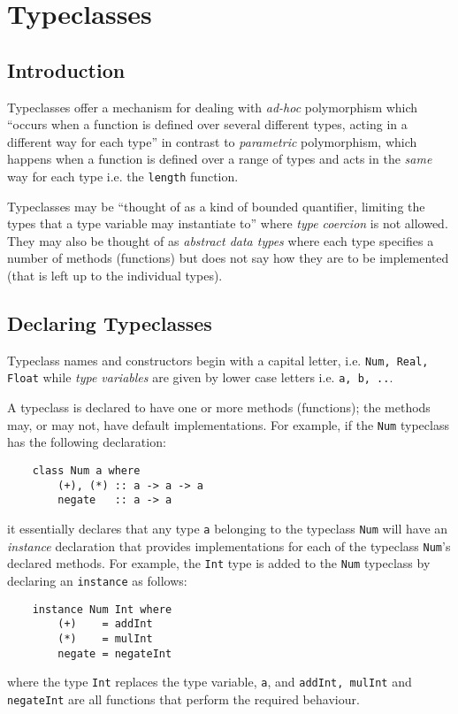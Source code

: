 \chapter{Typeclasses}
\section{Introduction}
Typeclasses offer a mechanism for dealing with {\em ad-hoc} polymorphism which ``occurs when a function is defined over several different types, acting in a different way for each type''  in contrast to  {\em parametric} polymorphism, which happens when a function is defined over a range of types and acts in  the {\em same} way  for each type i.e. the \texttt{length} function.  \citep {WADLER-BLOTT}

Typeclasses may be ``thought of as a kind of bounded quantifier, limiting the types that a type variable may instantiate to'' where {\em type coercion} is not allowed. They may also be thought of as {\em abstract data types} where each type specifies a number of methods (functions) but does not say how they are to be implemented (that is left up to the individual types).  \citep {WADLER-BLOTT}

\section{Declaring Typeclasses}
Typeclass names and constructors begin with a capital letter, i.e.  \texttt{Num, Real, Float} while {\em type variables} are given by lower case letters i.e. \texttt{a, b, ..}.

A typeclass is declared to have one or more methods (functions); the methods may, or may not, have default implementations. For example, if the \texttt{Num} typeclass has the following declaration:
\begin{lstlisting}
	class Num a where
		(+), (*) :: a -> a -> a
		negate   :: a -> a
\end{lstlisting}
it essentially declares that any type \texttt{a} belonging to the typeclass \texttt{Num} will have an {\em instance} declaration that provides implementations for each of the typeclass \texttt{Num}'s declared methods. For example, the \texttt{Int} type is added to the \texttt{Num} typeclass by declaring an \texttt{instance} as follows:
\begin{lstlisting}
	instance Num Int where
		(+)    = addInt    
		(*)    = mulInt
		negate = negateInt
\end{lstlisting}
where the type \texttt{Int} replaces the type variable, \texttt{a}, and \texttt{addInt, mulInt} and \texttt{negateInt} are all functions that perform the required behaviour.

